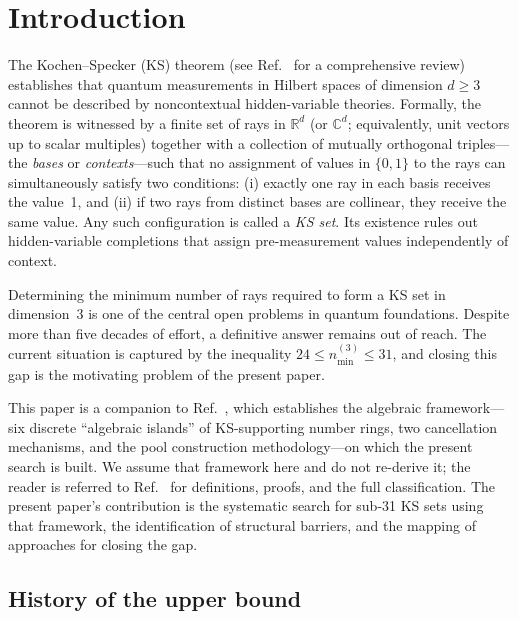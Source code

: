 \documentclass[twocolumn,pra,superscriptaddress,nofootinbib]{revtex4-2}
\newcommand{\R}{\mathbb{R}}
\newcommand{\C}{\mathbb{C}}
\begin{document}
\section{Introduction}
\label{sec:intro}

The Kochen--Specker (KS) theorem \cite{KochenSpecker1967} (see Ref.~\cite{Budroni2022} for a comprehensive review) establishes that quantum
measurements in Hilbert spaces of dimension $d \geq 3$ cannot be described by
noncontextual hidden-variable theories. Formally, the theorem is witnessed by a
finite set of rays in $\R^d$ (or $\C^d$; equivalently, unit vectors up to scalar multiples) together with
a collection of mutually orthogonal triples---the \emph{bases} or \emph{contexts}---such
that no assignment of values in $\{0,1\}$ to the rays can simultaneously satisfy two
conditions: (i) exactly one ray in each basis receives the value~1, and (ii) if two
rays from distinct bases are collinear, they receive the same value. Any such
configuration is called a \emph{KS set}. Its existence rules out hidden-variable
completions that assign pre-measurement values independently of context.

Determining the minimum number of rays required to form a KS set in dimension~3
is one of the central open problems in quantum foundations. Despite more than
five decades of effort, a definitive answer remains out of reach. The current
situation is captured by the inequality $24 \leq n_{\min}^{(3)} \leq 31$, and
closing this gap is the motivating problem of the present paper.

This paper is a companion to Ref.~\cite{Kernaghan2026algebraic}, which
establishes the algebraic framework---six discrete ``algebraic islands'' of
KS-supporting number rings, two cancellation mechanisms, and the pool
construction methodology---on which the present search is built. We assume
that framework here and do not re-derive it; the reader is referred to
Ref.~\cite{Kernaghan2026algebraic} for definitions, proofs, and the full
classification. The present paper's contribution is the systematic search
for sub-31 KS sets using that framework, the identification of structural
barriers, and the mapping of approaches for closing the gap.

\subsection*{History of the upper bound}
\end{document}
